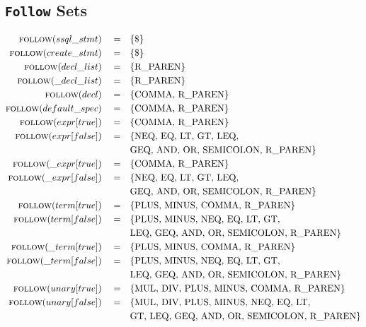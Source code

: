 \documentclass{article}
\begin{document}
\subsection{\texttt{Follow} Sets}
\begin{align*}
\textsc{follow}(ssql\_stmt)\quad =& \quad \{\text{\$}\} \\
\textsc{follow}(create\_stmt)\quad =& \quad \{\text{\$}\} \\
\textsc{follow}(decl\_list)\quad =& \quad \{\text{R\_PAREN}\} \\
\textsc{follow}(\_decl\_list)\quad =& \quad \{\text{R\_PAREN}\} \\
\textsc{follow}(decl)\quad =& \quad \{\text{COMMA, R\_PAREN}\} \\
\textsc{follow}(default\_spec)\quad =& \quad \{\text{COMMA, R\_PAREN}\} \\
\textsc{follow}(expr[true])\quad =& \quad \{\text{COMMA, R\_PAREN}\} \\
\textsc{follow}(expr[false])\quad =& \quad \{\text{NEQ, EQ, LT, GT, LEQ,}\\
 & \quad \text{GEQ, AND, OR, SEMICOLON, R\_PAREN}\} \\
\textsc{follow}(\_expr[true])\quad =& \quad \{\text{COMMA, R\_PAREN}\} \\
\textsc{follow}(\_expr[false])\quad =& \quad \{\text{NEQ, EQ, LT, GT, LEQ,}\\
& \quad \text{GEQ, AND, OR, SEMICOLON, R\_PAREN}\} \\
\textsc{follow}(term[true])\quad =& \quad \{\text{PLUS, MINUS, COMMA, R\_PAREN}\} \\
\textsc{follow}(term[false])\quad =& \quad \{\text{PLUS, MINUS, NEQ, EQ, LT, GT,}\\
& \quad \text{LEQ, GEQ, AND, OR, SEMICOLON, R\_PAREN}\} \\
\textsc{follow}(\_term[true])\quad =& \quad \{\text{PLUS, MINUS, COMMA, R\_PAREN}\} \\
\textsc{follow}(\_term[false])\quad =& \quad \{\text{PLUS, MINUS, NEQ, EQ, LT, GT,}\\
& \quad \text{LEQ, GEQ, AND, OR, SEMICOLON, R\_PAREN}\} \\
\textsc{follow}(unary[true])\quad =& \quad \{\text{MUL, DIV, PLUS, MINUS, COMMA, R\_PAREN}\} \\
\textsc{follow}(unary[false])\quad =& \quad \{\text{MUL, DIV, PLUS, MINUS, NEQ, EQ, LT,}\\
& \quad \text{GT, LEQ, GEQ, AND, OR, SEMICOLON, R\_PAREN}\} \\

\end{align*}
\end{document}
